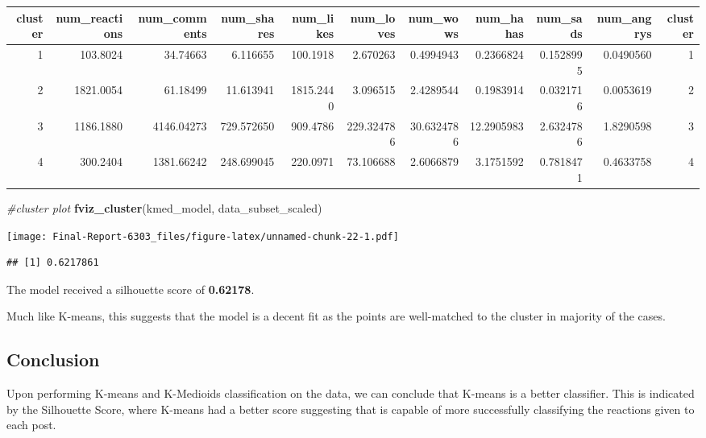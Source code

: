 \documentclass[
]{article}
\newenvironment{Shaded}{\begin{snugshade}}{\end{snugshade}}
\newcommand{\CommentTok}[1]{\textcolor[rgb]{0.56,0.35,0.01}{\textit{#1}}}
\newcommand{\FunctionTok}[1]{\textcolor[rgb]{0.13,0.29,0.53}{\textbf{#1}}}
\newcommand{\NormalTok}[1]{#1}
\newcommand{\OtherTok}[1]{\textcolor[rgb]{0.56,0.35,0.01}{#1}}
\newcommand{\SpecialCharTok}[1]{\textcolor[rgb]{0.81,0.36,0.00}{\textbf{#1}}}
\newcommand{\StringTok}[1]{\textcolor[rgb]{0.31,0.60,0.02}{#1}}
\begin{document}
\begin{table}
\centering
\begin{tabular}{rrrrrrrrrrr}
\toprule
cluster & num\_reactions & num\_comments & num\_shares & num\_likes & num\_loves & num\_wows & num\_hahas & num\_sads & num\_angrys & cluster\\
\midrule
1 & 103.8024 & 34.74663 & 6.116655 & 100.1918 & 2.670263 & 0.4994943 & 0.2366824 & 0.1528995 & 0.0490560 & 1\\
2 & 1821.0054 & 61.18499 & 11.613941 & 1815.2440 & 3.096515 & 2.4289544 & 0.1983914 & 0.0321716 & 0.0053619 & 2\\
3 & 1186.1880 & 4146.04273 & 729.572650 & 909.4786 & 229.324786 & 30.6324786 & 12.2905983 & 2.6324786 & 1.8290598 & 3\\
4 & 300.2404 & 1381.66242 & 248.699045 & 220.0971 & 73.106688 & 2.6066879 & 3.1751592 & 0.7818471 & 0.4633758 & 4\\
\bottomrule
\end{tabular}
\end{table}

\begin{Shaded}
\begin{Highlighting}[]
\CommentTok{\#cluster plot}
\FunctionTok{fviz\_cluster}\NormalTok{(kmed\_model, data\_subset\_scaled)}
\end{Highlighting}
\end{Shaded}

\texttt{[image: Final-Report-6303\_files/figure-latex/unnamed-chunk-22-1.pdf]}

\begin{Shaded}
\end{Shaded}

\begin{verbatim}
## [1] 0.6217861
\end{verbatim}

The model received a silhouette score of \textbf{0.62178}.

Much like K-means, this suggests that the model is a decent fit as the
points are well-matched to the cluster in majority of the cases.

\subsection{Conclusion}\label{conclusion}

Upon performing K-means and K-Medioids classification on the data, we
can conclude that K-means is a better classifier. This is indicated by
the Silhouette Score, where K-means had a better score suggesting that
is capable of more successfully classifying the reactions given to each
post.
\end{document}
